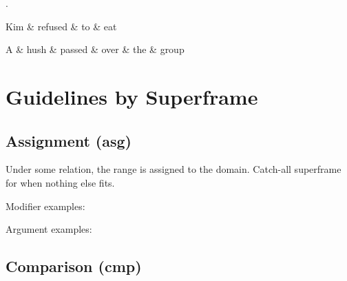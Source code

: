 \documentclass[a4paper]{article}
\newcommand\dep[1]{\iexec{python3 dep.py #1}}
\begin{document}
\ex.
\begin{dependency}
    \begin{deptext}
        Kim \& refused \& to \& eat \\
    \end{deptext}
\end{dependency}
\begin{dependency}
    \begin{deptext}
        A \& hush \& passed \& over \& the \& group \\
    \end{deptext}
\end{dependency}

\section{Guidelines by Superframe}


\subsection{Assignment (asg)}

Under some relation, the range is assigned to the domain. Catch-all superframe for when nothing else fits.

Modifier examples:

\immediate{}


%

Argument examples:

\subsection{Comparison (cmp)}
\end{document}
